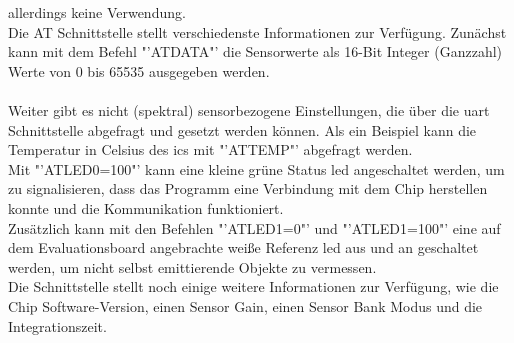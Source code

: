 \documentclass[11pt]{scrartcl}
\begin{document}
allerdings keine Verwendung.\\
Die AT Schnittstelle stellt verschiedenste Informationen zur Verfügung. Zunächst kann mit dem Befehl "'ATDATA"' die Sensorwerte als
16-Bit Integer (Ganzzahl) Werte von 0 bis 65535 ausgegeben werden.\\
\\
Weiter gibt es nicht (spektral) sensorbezogene Einstellungen, die über die \ac{uart} Schnittstelle abgefragt und gesetzt werden können.
Als ein Beispiel kann die Temperatur in Celsius des \ac{ic}s mit "'ATTEMP"' abgefragt werden.\\
Mit "'ATLED0=100"' kann eine kleine grüne Status \ac{led} angeschaltet werden, um zu signalisieren, dass das Programm eine Verbindung mit 
dem Chip herstellen konnte und die Kommunikation funktioniert.\\
Zusätzlich kann mit den Befehlen "'ATLED1=0"' und "'ATLED1=100"' eine auf dem Evaluationsboard angebrachte weiße Referenz \ac{led} aus und
an geschaltet werden, um nicht selbst emittierende Objekte zu vermessen.\\
Die Schnittstelle stellt noch einige weitere Informationen zur Verfügung, wie die Chip Software-Version, einen Sensor Gain, einen Sensor
Bank Modus und die Integrationszeit.
\end{document}
